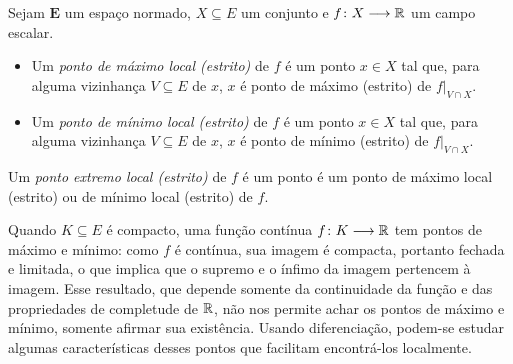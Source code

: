 \begin{comment}
\begin{definition}[Ponto extremo local]
Sejam $\bm E$ um espaço normado, $X \subseteq E$ um conjunto e $\fun{f}{X}{\R}$ um campo escalar.
	\begin{itemize}
	\item Um \emph{ponto de máximo local} de $f$ é um ponto $x \in X$ tal que, para alguma vizinhança $V \subseteq E$ de $x$, $f$ satisfaz que, para todo $x' \in V \cap X$,
		\begin{equation*}
		f(x') \leq f(x).
		\end{equation*}
	\item Um \emph{ponto de mínimo local} de $f$ é um ponto $x \in X$ tal que, para alguma vizinhança $V \subseteq E$ de $x$, $f$ satisfaz que, para todo $x' \in V \cap X$,
		\begin{equation*}
		f(x) \leq f(x').
		\end{equation*}
	\end{itemize}
Um \emph{ponto extremo local} de $f$ é um ponto é um ponto de máximo local ou de mínimo local de $f$.
\end{definition}
\end{comment}

\begin{definition}
Sejam $\bm E$ um espaço normado, $X \subseteq E$ um conjunto e $f\colon \allowbreak X \longrightarrow \mathbb{R}$ um campo escalar.
	\begin{itemize}
	\item Um \emph{ponto de máximo local (estrito)} de $f$ é um ponto $x \in X$ tal que, para alguma vizinhança $V \subseteq E$ de $x$, $x$ é ponto de máximo (estrito) de $f|_{V \cap X}$.
	\item Um \emph{ponto de mínimo local (estrito)} de $f$ é um ponto $x \in X$ tal que, para alguma vizinhança $V \subseteq E$ de $x$, $x$ é ponto de mínimo (estrito) de $f|_{V \cap X}$.
	\end{itemize}
Um \emph{ponto extremo local (estrito)} de $f$ é um ponto é um ponto de máximo local (estrito) ou de mínimo local (estrito) de $f$.
\end{definition}

Quando $K \subseteq E$ é compacto, uma função contínua $f\colon \allowbreak K \longrightarrow \mathbb{R}$ tem pontos de máximo e mínimo: como $f$ é contínua, sua imagem é compacta, portanto fechada e limitada, o que implica que o supremo e o ínfimo da imagem pertencem à imagem. Esse resultado, que depende somente da continuidade da função e das propriedades de completude de $\mathbb{R}$, não nos permite achar os pontos de máximo e mínimo, somente afirmar sua existência. Usando diferenciação, podem-se estudar algumas características desses pontos que facilitam encontrá-los localmente.

